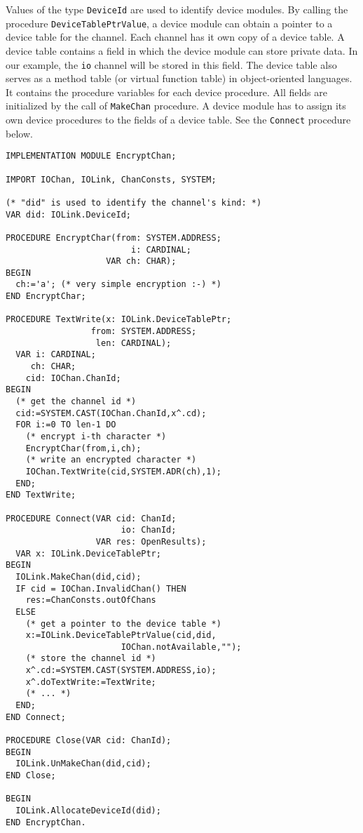 Values of the type {\tt DeviceId} are used to identify device
modules. By calling the procedure {\tt DeviceTablePtrValue}, a
device module can obtain a pointer to a device table for the
channel. Each channel has it own copy of a device table. A
device table contains a field in which the device module can
store private data. In our example, the {\tt io} channel will be
stored in this field. The device table also serves as a method
table (or virtual function table) in object-oriented languages.
It contains the procedure variables for each device procedure. All
fields are initialized by the call of {\tt MakeChan} procedure. A
device module has to assign its own device procedures to the
fields of a device table. See the {\tt Connect} procedure below.

\begin{verbatim}
IMPLEMENTATION MODULE EncryptChan;

IMPORT IOChan, IOLink, ChanConsts, SYSTEM;

(* "did" is used to identify the channel's kind: *)
VAR did: IOLink.DeviceId;

PROCEDURE EncryptChar(from: SYSTEM.ADDRESS;
                         i: CARDINAL;
                    VAR ch: CHAR);
BEGIN
  ch:='a'; (* very simple encryption :-) *)
END EncryptChar;

PROCEDURE TextWrite(x: IOLink.DeviceTablePtr;
                 from: SYSTEM.ADDRESS;
                  len: CARDINAL);
  VAR i: CARDINAL;
     ch: CHAR;
    cid: IOChan.ChanId;
BEGIN
  (* get the channel id *)
  cid:=SYSTEM.CAST(IOChan.ChanId,x^.cd);
  FOR i:=0 TO len-1 DO
    (* encrypt i-th character *)
    EncryptChar(from,i,ch);
    (* write an encrypted character *)
    IOChan.TextWrite(cid,SYSTEM.ADR(ch),1);
  END;
END TextWrite;

PROCEDURE Connect(VAR cid: ChanId;
                       io: ChanId;
                  VAR res: OpenResults);
  VAR x: IOLink.DeviceTablePtr;
BEGIN
  IOLink.MakeChan(did,cid);
  IF cid = IOChan.InvalidChan() THEN
    res:=ChanConsts.outOfChans
  ELSE
    (* get a pointer to the device table *)
    x:=IOLink.DeviceTablePtrValue(cid,did,
                       IOChan.notAvailable,"");
    (* store the channel id *)
    x^.cd:=SYSTEM.CAST(SYSTEM.ADDRESS,io);
    x^.doTextWrite:=TextWrite;
    (* ... *)
  END;
END Connect;

PROCEDURE Close(VAR cid: ChanId);
BEGIN
  IOLink.UnMakeChan(did,cid);
END Close;

BEGIN
  IOLink.AllocateDeviceId(did);
END EncryptChan.
\end{verbatim}

